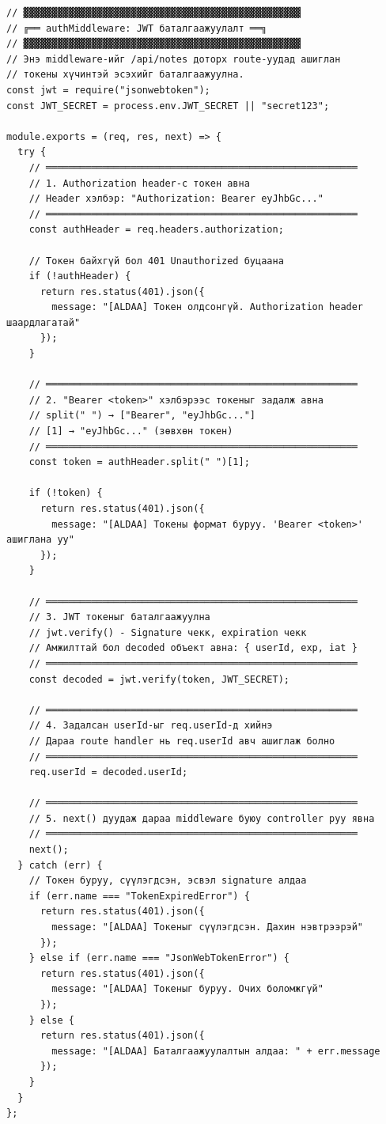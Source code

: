 \begin{lstlisting}[caption={middleware/authMiddleware.js -- JWT validation}]
// ▓▓▓▓▓▓▓▓▓▓▓▓▓▓▓▓▓▓▓▓▓▓▓▓▓▓▓▓▓▓▓▓▓▓▓▓▓▓▓▓▓▓▓▓▓▓▓▓▓
// ╔══ authMiddleware: JWT баталгаажуулалт ══╗
// ▓▓▓▓▓▓▓▓▓▓▓▓▓▓▓▓▓▓▓▓▓▓▓▓▓▓▓▓▓▓▓▓▓▓▓▓▓▓▓▓▓▓▓▓▓▓▓▓▓
// Энэ middleware-ийг /api/notes доторх route-уудад ашиглан
// токены хүчинтэй эсэхийг баталгаажуулна.
const jwt = require("jsonwebtoken");
const JWT_SECRET = process.env.JWT_SECRET || "secret123";

module.exports = (req, res, next) => {
  try {
    // ═══════════════════════════════════════════════════════
    // 1. Authorization header-с токен авна
    // Header хэлбэр: "Authorization: Bearer eyJhbGc..."
    // ═══════════════════════════════════════════════════════
    const authHeader = req.headers.authorization;

    // Токен байхгүй бол 401 Unauthorized буцаана
    if (!authHeader) {
      return res.status(401).json({
        message: "[ALDAA] Токен олдсонгүй. Authorization header шаардлагатай"
      });
    }

    // ═══════════════════════════════════════════════════════
    // 2. "Bearer <token>" хэлбэрээс токеныг задалж авна
    // split(" ") → ["Bearer", "eyJhbGc..."]
    // [1] → "eyJhbGc..." (зөвхөн токен)
    // ═══════════════════════════════════════════════════════
    const token = authHeader.split(" ")[1];

    if (!token) {
      return res.status(401).json({
        message: "[ALDAA] Токены формат буруу. 'Bearer <token>' ашиглана уу"
      });
    }

    // ═══════════════════════════════════════════════════════
    // 3. JWT токеныг баталгаажуулна
    // jwt.verify() - Signature чекк, expiration чекк
    // Амжилттай бол decoded объект авна: { userId, exp, iat }
    // ═══════════════════════════════════════════════════════
    const decoded = jwt.verify(token, JWT_SECRET);

    // ═══════════════════════════════════════════════════════
    // 4. Задалсан userId-ыг req.userId-д хийнэ
    // Дараа route handler нь req.userId авч ашиглаж болно
    // ═══════════════════════════════════════════════════════
    req.userId = decoded.userId;

    // ═══════════════════════════════════════════════════════
    // 5. next() дуудаж дараа middleware буюу controller руу явна
    // ═══════════════════════════════════════════════════════
    next();
  } catch (err) {
    // Токен буруу, сүүлэгдсэн, эсвэл signature алдаа
    if (err.name === "TokenExpiredError") {
      return res.status(401).json({
        message: "[ALDAA] Токеныг сүүлэгдсэн. Дахин нэвтрээрэй"
      });
    } else if (err.name === "JsonWebTokenError") {
      return res.status(401).json({
        message: "[ALDAA] Токеныг буруу. Очих боломжгүй"
      });
    } else {
      return res.status(401).json({
        message: "[ALDAA] Баталгаажуулалтын алдаа: " + err.message
      });
    }
  }
};
\end{lstlisting}

